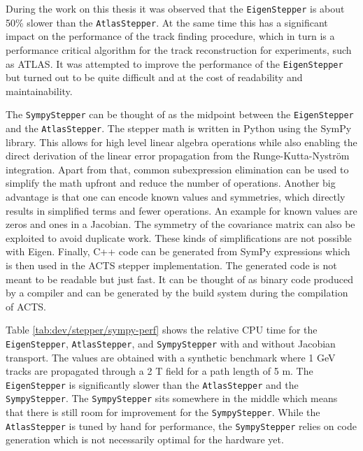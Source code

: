 During the work on this thesis it was observed that the \texttt{EigenStepper} is about 50\% slower than the \texttt{AtlasStepper}. At the same time this has a significant impact on the performance of the track finding procedure, which in turn is a performance critical algorithm for the track reconstruction for experiments, such as ATLAS. It was attempted to improve the performance of the \texttt{EigenStepper} but turned out to be quite difficult and at the cost of readability and maintainability.

The \texttt{SympyStepper} can be thought of as the midpoint between the \texttt{EigenStepper} and the \texttt{AtlasStepper}. The stepper math is written in Python using the SymPy library. This allows for high level linear algebra operations while also enabling the direct derivation of the linear error propagation from the Runge-Kutta-Nyström integration. Apart from that, common subexpression elimination can be used to simplify the math upfront and reduce the number of operations. Another big advantage is that one can encode known values and symmetries, which directly results in simplified terms and fewer operations. An example for known values are zeros and ones in a Jacobian. The symmetry of the covariance matrix can also be exploited to avoid duplicate work. These kinds of simplifications are not possible with Eigen. Finally, C++ code can be generated from SymPy expressions which is then used in the ACTS stepper implementation. The generated code is not meant to be readable but just fast. It can be thought of as binary code produced by a compiler and can be generated by the build system during the compilation of ACTS.



Table \ref{tab:dev/stepper/sympy-perf} shows the relative CPU time for the \texttt{EigenStepper}, \texttt{AtlasStepper}, and \texttt{SympyStepper} with and without Jacobian transport. The values are obtained with a synthetic benchmark where 1 GeV tracks are propagated through a 2 T field for a path length of 5 m. The \texttt{EigenStepper} is significantly slower than the \texttt{AtlasStepper} and the \texttt{SympyStepper}. The \texttt{SympyStepper} sits somewhere in the middle which means that there is still room for improvement for the \texttt{SympyStepper}. While the \texttt{AtlasStepper} is tuned by hand for performance, the \texttt{SympyStepper} relies on code generation which is not necessarily optimal for the hardware yet.


